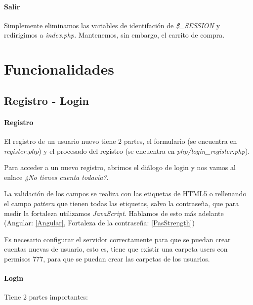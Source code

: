 \documentclass{apuntes}
\begin{document}
\paragraph{Salir}

Simplemente eliminamos las variables de identifación de \textit{\$\_SESSION} y redirigimos a \textit{index.php}. Mantenemos, sin embargo, el carrito de compra.


\section{Funcionalidades}

\subsection{Registro - Login}

\paragraph{Registro}


El registro de un usuario nuevo tiene 2 partes, el formulario (se encuentra en \textit{register.php}) y el procesado del registro (se encuentra en \textit{php/login\_register.php}).

Para acceder a un nuevo registro, abrimos el diálogo de login y nos vamos al enlace \textit{¿No tienes cuenta todavía?}. 

La validación de los campos se realiza con las etiquetas de HTML5 o rellenando el campo \textit{pattern} que tienen todas las etiquetas, salvo la contraseña, que para medir la fortaleza utilizamos \textit{JavaScript}. Hablamos de esto más adelante (Angular: \ref{Angular}, Fortaleza de la contraseña: \ref{PasStrength})

\label{errorRegister}

Es necesario configurar el servidor correctamente para que se puedan crear cuentas nuevas de usuario, esto es, tiene que existir una carpeta users con permisos 777, para que se puedan crear las carpetas de los usuarios.

\paragraph{Login}

Tiene 2 partes importantes:
\end{document}
